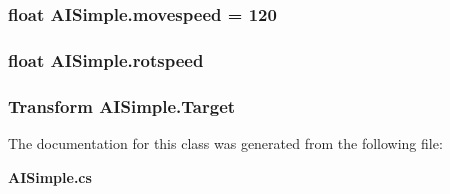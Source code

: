 \subsubsection[{movespeed}]{\setlength{\rightskip}{0pt plus 5cm}float A\+I\+Simple.\+movespeed = 120}\label{class_a_i_simple_a612fd73d8cf7b35ca4776302035c6150}
\subsubsection[{rotspeed}]{\setlength{\rightskip}{0pt plus 5cm}float A\+I\+Simple.\+rotspeed}\label{class_a_i_simple_a5703fc3387f1b9d703aa246c20671e44}
\subsubsection[{Target}]{\setlength{\rightskip}{0pt plus 5cm}Transform A\+I\+Simple.\+Target}\label{class_a_i_simple_ac7cfecde0451036c2c98c8ad04419ed2}


The documentation for this class was generated from the following file\+:\begin{DoxyCompactItemize}
\item 
{\bf A\+I\+Simple.\+cs}\end{DoxyCompactItemize}
